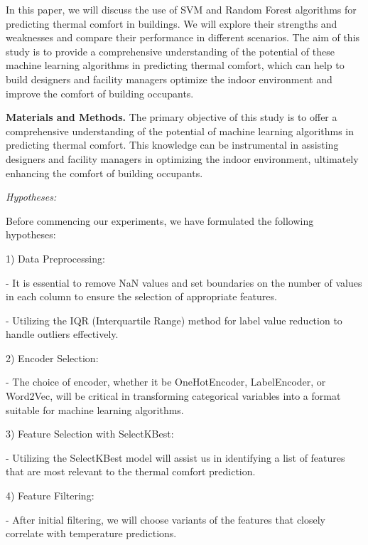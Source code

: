 In this paper, we will discuss the use of SVM and Random Forest
algorithms for predicting thermal comfort in buildings. We will explore
their strengths and weaknesses and compare their performance in
different scenarios. The aim of this study is to provide a comprehensive
understanding of the potential of these machine learning algorithms in
predicting thermal comfort, which can help to build designers and
facility managers optimize the indoor environment and improve the
comfort of building occupants.

{\bfseries Materials and Methods.} The primary objective of this study is
to offer a comprehensive understanding of the potential of machine
learning algorithms in predicting thermal comfort. This knowledge can be
instrumental in assisting designers and facility managers in optimizing
the indoor environment, ultimately enhancing the comfort of building
occupants.

\emph{Hypotheses:}

Before commencing our experiments, we have formulated the following
hypotheses:

1) Data Preprocessing:

- It is essential to remove NaN values and set boundaries on the number
of values in each column to ensure the selection of appropriate
features.

- Utilizing the IQR (Interquartile Range) method for label value
reduction to handle outliers effectively.

2) Encoder Selection:

- The choice of encoder, whether it be OneHotEncoder, LabelEncoder, or
Word2Vec, will be critical in transforming categorical variables into a
format suitable for machine learning algorithms.

3) Feature Selection with SelectKBest:

- Utilizing the SelectKBest model will assist us in identifying a list
of features that are most relevant to the thermal comfort prediction.

4) Feature Filtering:

- After initial filtering, we will choose variants of the features that
closely correlate with temperature predictions.

